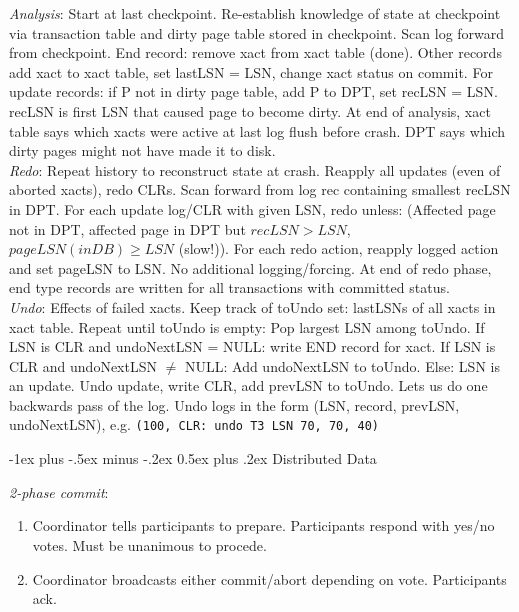 \documentclass[10pt,landscape]{article}
\makeatletter
\renewcommand{\section}{\@startsection{section}{1}{0mm}%
                                {-1ex plus -.5ex minus -.2ex}%
                                {0.5ex plus .2ex}%
                                {\normalfont\large\bfseries}}
\makeatother
\begin{document}
\begin{multicols}{3}
\textit{Analysis}: Start at last checkpoint. Re-establish knowledge of state at checkpoint via transaction table and dirty page table stored in checkpoint. Scan log forward from checkpoint. End record: remove xact from xact table (done). Other records add xact to xact table, set lastLSN = LSN, change xact status on commit. For update records: if P not in dirty page table, add P to DPT, set recLSN = LSN. recLSN is first LSN that caused page to become dirty. At end of analysis, xact table says which xacts were active at last log flush before crash. DPT says which dirty pages might not have made it to disk. \\
\textit{Redo}: Repeat history to reconstruct state at crash. Reapply all updates (even of aborted xacts), redo CLRs. Scan forward from log rec containing smallest recLSN in DPT. For each update log/CLR with given LSN, redo unless: (Affected page not in DPT, affected page in DPT but $recLSN > LSN$, $pageLSN(inDB) \ge LSN$ (slow!)). For each redo action, reapply logged action and set pageLSN to LSN. No additional logging/forcing. At end of redo phase, end type records are written for all transactions with committed status. \\
\textit{Undo}: Effects of failed xacts. Keep track of toUndo set: lastLSNs of all xacts in xact table. Repeat until toUndo is empty: Pop largest LSN among toUndo. If LSN is CLR and undoNextLSN = NULL: write END record for xact. If LSN is CLR and undoNextLSN $\ne$ NULL: Add undoNextLSN to toUndo. Else: LSN is an update. Undo update, write CLR, add prevLSN to toUndo. Lets us do one backwards pass of the log. Undo logs in the form (LSN, record, prevLSN, undoNextLSN), e.g. \texttt{(100, CLR: undo T3 LSN 70, 70, 40)}


\section{Distributed Data}

\textit{2-phase commit}:

\begin{enumerate}
  \item Coordinator tells participants to prepare. Participants respond with yes/no votes. Must be unanimous to procede.
  \item Coordinator broadcasts either commit/abort depending on vote. Participants ack.
\end{enumerate}


\end{multicols}
\end{document}
